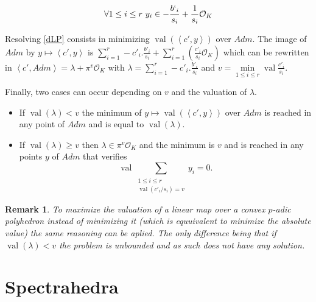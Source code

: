 \documentclass[a4paper,12pt]{article}
\newtheorem{remark}[theorem]{Remark}
\DeclareMathOperator{\val}{val}
\newcommand{\OK}{\mathcal{O}_K}
\begin{document}
\begin{equation}
	\forall 1 \le i\le r  \ y_i \in -\frac{b`_i}{s_i} + \frac{1}{s_i} \OK
\end{equation}


Resolving \ref{dLP} consists in minimizing $\val\left(\left<c',y \right>\right)$ over $Adm$. The image of $Adm$ by $y \mapsto \left<c',y \right>$ is $\sum_{i=1}^r -c'_i.\frac{b'_i}{s_i} + \sum_{i=1}^r\left( \frac{c'_i}{s_{i}} \OK \right)$ which can be rewritten in $\left<c',Adm \right> = \lambda + \pi^{v} \OK$ with $\lambda = \sum_{i=1}^r -c'_i.\frac{b'_i}{s_i}$ and $v = \min\limits_{1\le i\le r} \val \frac{c'_{i}}{s_{i}} $.

Finally, two cases can occur depending on $v$ and the valuation of $\lambda$.
\begin{itemize}
	\item If $\val( \lambda) < v$ the minimum of $y\mapsto \val\left(\left<c',y \right>\right)$ over $Adm$ is reached in any point of $Adm$ and is equal to $\val\left( \lambda\right)$.
	\item If $\val\left( \lambda \right) \ge v$ then $\lambda \in \pi^{v} \OK$ and the minimum is $v $ and is reached in any points $y$ of $Adm$ that verifies 
	\[\val \underset{ \begin{array}{c} 1\le i\le r\\ \val\left(c'_{i}/{s_{i}} \right) = v  \end{array}}{\sum} y_{i} = 0. \]
	
\end{itemize}
\begin{remark}
	To maximize the valuation of a linear map over a convex $p$-adic polyhedron instead of minimizing it (which is equuivalent to minimize the absolute value) the same reasoning can be aplied. The only difference being that if $\val\left( \lambda\right) < v$ the problem is unbounded and as such does not have any solution. 
\end{remark}




\section{Spectrahedra}
\end{document}
